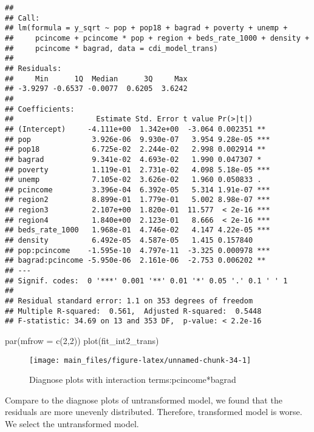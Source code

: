 \documentclass[
  11pt,
]{article}
\newenvironment{Shaded}{\begin{snugshade}}{\end{snugshade}}
\newcommand{\AttributeTok}[1]{\textcolor[rgb]{0.77,0.63,0.00}{#1}}
\newcommand{\DecValTok}[1]{\textcolor[rgb]{0.00,0.00,0.81}{#1}}
\newcommand{\FunctionTok}[1]{\textcolor[rgb]{0.00,0.00,0.00}{#1}}
\newcommand{\NormalTok}[1]{#1}
\begin{document}
\begin{verbatim}
## 
## Call:
## lm(formula = y_sqrt ~ pop + pop18 + bagrad + poverty + unemp + 
##     pcincome + pcincome * pop + region + beds_rate_1000 + density + 
##     pcincome * bagrad, data = cdi_model_trans)
## 
## Residuals:
##     Min      1Q  Median      3Q     Max 
## -3.9297 -0.6537 -0.0077  0.6205  3.6242 
## 
## Coefficients:
##                   Estimate Std. Error t value Pr(>|t|)    
## (Intercept)     -4.111e+00  1.342e+00  -3.064 0.002351 ** 
## pop              3.926e-06  9.930e-07   3.954 9.28e-05 ***
## pop18            6.725e-02  2.244e-02   2.998 0.002914 ** 
## bagrad           9.341e-02  4.693e-02   1.990 0.047307 *  
## poverty          1.119e-01  2.731e-02   4.098 5.18e-05 ***
## unemp            7.105e-02  3.626e-02   1.960 0.050833 .  
## pcincome         3.396e-04  6.392e-05   5.314 1.91e-07 ***
## region2          8.899e-01  1.779e-01   5.002 8.98e-07 ***
## region3          2.107e+00  1.820e-01  11.577  < 2e-16 ***
## region4          1.840e+00  2.123e-01   8.666  < 2e-16 ***
## beds_rate_1000   1.968e-01  4.746e-02   4.147 4.22e-05 ***
## density          6.492e-05  4.587e-05   1.415 0.157840    
## pop:pcincome    -1.595e-10  4.797e-11  -3.325 0.000978 ***
## bagrad:pcincome -5.950e-06  2.161e-06  -2.753 0.006202 ** 
## ---
## Signif. codes:  0 '***' 0.001 '**' 0.01 '*' 0.05 '.' 0.1 ' ' 1
## 
## Residual standard error: 1.1 on 353 degrees of freedom
## Multiple R-squared:  0.561,  Adjusted R-squared:  0.5448 
## F-statistic: 34.69 on 13 and 353 DF,  p-value: < 2.2e-16
\end{verbatim}

\begin{Shaded}
\begin{Highlighting}[]
\FunctionTok{par}\NormalTok{(}\AttributeTok{mfrow =} \FunctionTok{c}\NormalTok{(}\DecValTok{2}\NormalTok{,}\DecValTok{2}\NormalTok{))}
\FunctionTok{plot}\NormalTok{(fit\_int2\_trans)}
\end{Highlighting}
\end{Shaded}

\begin{figure}
\texttt{[image: main\_files/figure-latex/unnamed-chunk-34-1]} \caption{\label{fig:figs}Diagnose plots with interaction terms:pcincome*bagrad}\label{fig:unnamed-chunk-34}
\end{figure}

Compare to the diagnose plots of untransformed model, we found that the
residuals are more unevenly distributed. Therefore, transformed model is
worse. We select the untransformed model.
\end{document}
